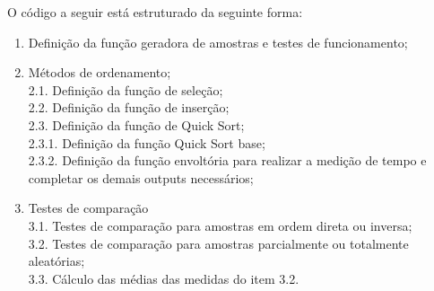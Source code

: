 \documentclass[
]{article}
\providecommand{\tightlist}{%
  \setlength{\itemsep}{0pt}\setlength{\parskip}{0pt}}
\begin{document}
O código a seguir está estruturado da seguinte forma:

\begin{enumerate}
\def\labelenumi{\arabic{enumi}.}
\tightlist
\item
  Definição da função geradora de amostras e testes de funcionamento;\\
\item
  Métodos de ordenamento;\\
  2.1. Definição da função de seleção;\\
  2.2. Definição da função de inserção;\\
  2.3. Definição da função de Quick Sort;\\
  2.3.1. Definição da função Quick Sort base;\\
  2.3.2. Definição da função envoltória para realizar a medição de tempo
  e completar os demais outputs necessários;
\item
  Testes de comparação\\
  3.1. Testes de comparação para amostras em ordem direta ou inversa;\\
  3.2. Testes de comparação para amostras parcialmente ou totalmente
  aleatórias;\\
  3.3. Cálculo das médias das medidas do item 3.2.
\end{enumerate}
\end{document}
